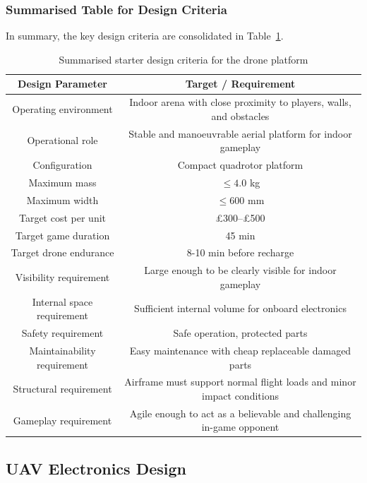 \documentclass{report_template_oxford}
\begin{document}
\subsubsection{Summarised Table for Design Criteria}

In summary, the key design criteria are consolidated in Table~\ref{tab:starter_design_criteria}.

\begin{table}[htbp]
\centering
\caption{Summarised starter design criteria for the drone platform}
\label{tab:starter_design_criteria}
\begin{tabular}{|c|c|}
\hline
\textbf{Design Parameter} & \textbf{Target / Requirement} \\
\hline
Operating environment & Indoor arena with close proximity to players, walls, and obstacles \\
\hline
Operational role & Stable and manoeuvrable aerial platform for indoor gameplay \\
\hline
Configuration & Compact quadrotor platform \\
\hline
Maximum mass & $\leq 4.0$ kg \\
\hline
Maximum width & $\leq 600$ mm \\
\hline
Target cost per unit & \pounds300--\pounds500 \\
\hline
Target game duration & 45 min \\
\hline
Target drone endurance & 8-10 min before recharge \\
\hline
Visibility requirement & Large enough to be clearly visible for indoor gameplay \\
\hline
Internal space requirement & Sufficient internal volume for onboard electronics \\
\hline
Safety requirement & Safe operation, protected parts \\
\hline
Maintainability requirement & Easy maintenance with cheap replaceable damaged parts \\
\hline
Structural requirement & Airframe must support normal flight loads and minor impact conditions \\
\hline
Gameplay requirement & Agile enough to act as a believable and challenging in-game opponent \\
\hline
\end{tabular}
\end{table}

\subsection{UAV Electronics Design}
\label{sec:electronics_design}
\end{document}
